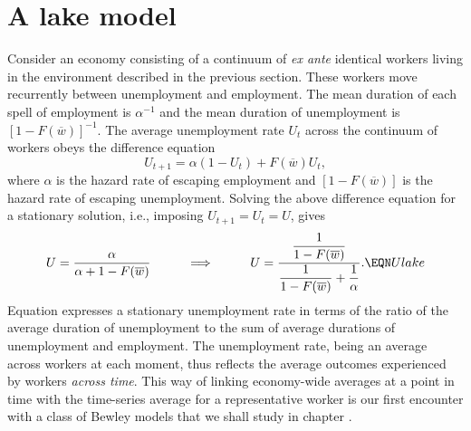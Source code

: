 
\section{A lake model}

  Consider an economy consisting of a continuum of {\it ex ante\/}
identical  workers  living in the environment described in the previous
section.  These workers move recurrently between unemployment
and employment.
The mean duration of each spell of employment
is $\alpha^{-1}$ and the mean duration of unemployment
is $[1 - F(\overline w)]^{-1}$.    The average unemployment rate
$U_t$
across the continuum of workers  obeys the difference equation
$$ U_{t+1} = \alpha (1 - U_t ) + F(\overline w) U_t ,  $$
where $\alpha$ is the hazard rate  of escaping employment
and $[1 - F(\overline w)]$ is the hazard rate of escaping unemployment.
Solving the above difference equation for a stationary solution, i.e., imposing
$U_{t+1} = U_t = U$, gives
$$ U ={\alpha \over \alpha + 1 - F (\overline w) } \hskip1cm \Longrightarrow
\hskip1cm
U = {\displaystyle {1 \over 1 - F(\overline w)} \over
  \displaystyle { 1 \over  1 - F(\overline w)} + {1 \over \alpha}  } .
\EQN Ulake $$
Equation  expresses a  stationary unemployment   rate in terms
of the ratio of the average duration of unemployment to the
sum of average durations of unemployment and employment.   The
unemployment rate, being an average across workers   at each    moment,
thus reflects the average
outcomes experienced by workers {\it across time}.
This way of linking economy-wide averages at a point in time with the
time-series average for a representative worker is our first
encounter with a class of Bewley models that we  shall study  in chapter .

